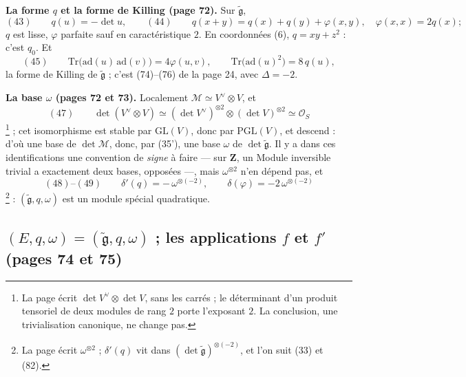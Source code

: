\documentclass[11pt,a4paper]{article}
\begin{document}
\textbf{La forme $q$ et la forme de Killing (page 72).} Sur $\widetilde{\mathfrak{g}}$,
\[
  (43) \qquad q(u) = -\det u , \qquad
  (44) \qquad q(x + y) = q(x) + q(y) + \varphi(x, y) , \quad \varphi(x, x) = 2q(x) ;
\]
$q$ est lisse, $\varphi$ parfaite sauf en caractéristique $2$. En coordonnées (6),
$q = xy + z^2$ : c'est $q_0$. Et
\[
  (45) \qquad \mathrm{Tr}\bigl(\mathrm{ad}(u)\,\mathrm{ad}(v)\bigr) = 4\varphi(u, v) , \qquad
  \mathrm{Tr}\bigl(\mathrm{ad}(u)^2\bigr) = 8\,q(u) ,
\]
la forme de Killing de $\widetilde{\mathfrak{g}}$ ; c'est (74)--(76) de la page 24,
avec $\Delta = -2$.

\textbf{La base $\omega$ (pages 72 et 73).} Localement $\mathcal{M} \simeq V^{\vee} \otimes V$,
et
\[
  (47) \qquad \det(V^{\vee} \otimes V) \simeq (\det V^{\vee})^{\otimes 2} \otimes (\det V)^{\otimes 2} \simeq \mathcal{O}_S
\]
\footnote{La page écrit $\det V^{\vee} \otimes \det V$, sans les carrés ; le
déterminant d'un produit tensoriel de deux modules de rang $2$ porte l'exposant
$2$. La conclusion, une trivialisation canonique, ne change pas.} ; cet
isomorphisme est stable par $\mathrm{GL}(V)$, donc par $\mathrm{PGL}(V)$, et descend :
d'où une base de $\det\mathcal{M}$, donc, par (35'), une base $\omega$ de
$\det\widetilde{\mathfrak{g}}$. Il y a dans ces identifications une convention de
\emph{signe} à faire — sur $\mathbf{Z}$, un Module inversible trivial a exactement deux
bases, opposées —, mais $\omega^{\otimes 2}$ n'en dépend pas, et
\[
  (48)\text{--}(49) \qquad \delta'(q) = -\,\omega^{\otimes(-2)} , \qquad \delta(\varphi) = -2\,\omega^{\otimes(-2)}
\]
\footnote{La page écrit $\omega^{\otimes 2}$ ; $\delta'(q)$ vit dans
$(\det\widetilde{\mathfrak{g}})^{\otimes(-2)}$, et l'on suit (33) et (82).} : $(\widetilde{\mathfrak{g}},
q, \omega)$ est un module spécial quadratique.

\subsection*{$(E, q, \omega) = (\widetilde{\mathfrak{g}}, q, \omega)$ ; les applications $f$ et $f'$ (pages 74 et 75)}
\end{document}

